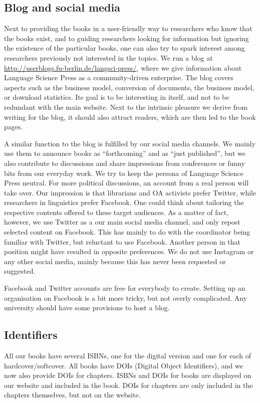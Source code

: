 \documentclass[guidelines,nonflat,modfonts] {langsci/langscibook}
\begin{document}
\subsection{Blog and social media}
Next to providing the books in a user-friendly way to researchers who know that the books exist, and to guiding researchers looking for information but ignoring the existence of the particular books, one can also try to spark interest among researchers previously not interested in the topics. We run a blog at \url{http://userblogs.fu-berlin.de/langsci-press/}, where we give information about Language Science Press as a community-driven enterprise. The blog covers aspects such as the business model, conversion of documents, the business model, or download statistics. Its goal is to be interesting in itself, and not to be redundant with the main website. Next to the intrinsic pleasure we derive from writing for the blog, it should also attract readers, which are then led to the book pages.  

A similar function to the blog is fulfilled by our social media channels. We mainly use them to announce books as ``forthcoming'' and as ``just published'', but we also contribute to discussions and share impressions from conferences or funny bits from our everyday work. We try to keep the persona of Language Science Press neutral. For more political discussions, an account from a real person will take over. Our impression is that librarians and OA activists prefer Twitter, while researchers in linguistics prefer Facebook. One could think about tailoring the respective contents offered to these target audiences. As a matter of fact, however, we use Twitter as a our main social media channel, and only repost selected content on Facebook. This has mainly to do with the coordinator being familiar with Twitter, but reluctant to use Facebook. Another person in that position might have resulted in opposite preferences. We do not use Instagram or any other social media, mainly because this has never been requested or suggested.

Facebook and Twitter accounts are free for everybody to create. Setting up an organisation on Facebook is a bit more tricky, but not overly complicated. Any university should have some provisions to host a blog.


\subsection{Identifiers}
All our books have several ISBNs, one for the digital version and one for each of hardcover/softcover. All books have DOIs (Digital Object Identifiers), and we now also provide DOIs for chapters. ISBNs and DOIs for books are displayed on our website and included in the book. DOIs for chapters are only included in the chapters themselves, but not on the website. 
\end{document}

